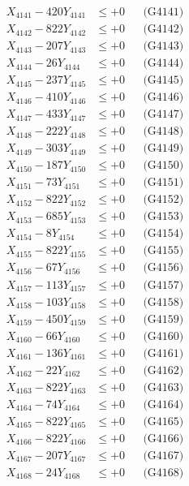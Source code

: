 \documentclass[a4paper,10pt]{article}
\begin{document}
{\begin{align}
\allowbreak
X_{4141} - 420Y_{4141} &\leq +0 && \text{(G4141)} \\
X_{4142} - 822Y_{4142} &\leq +0 && \text{(G4142)} \\
X_{4143} - 207Y_{4143} &\leq +0 && \text{(G4143)} \\
X_{4144} - 26Y_{4144} &\leq +0 && \text{(G4144)} \\
X_{4145} - 237Y_{4145} &\leq +0 && \text{(G4145)} \\
X_{4146} - 410Y_{4146} &\leq +0 && \text{(G4146)} \\
X_{4147} - 433Y_{4147} &\leq +0 && \text{(G4147)} \\
X_{4148} - 222Y_{4148} &\leq +0 && \text{(G4148)} \\
X_{4149} - 303Y_{4149} &\leq +0 && \text{(G4149)} \\
X_{4150} - 187Y_{4150} &\leq +0 && \text{(G4150)} \\
\allowbreak
X_{4151} - 73Y_{4151} &\leq +0 && \text{(G4151)} \\
X_{4152} - 822Y_{4152} &\leq +0 && \text{(G4152)} \\
X_{4153} - 685Y_{4153} &\leq +0 && \text{(G4153)} \\
X_{4154} - 8Y_{4154} &\leq +0 && \text{(G4154)} \\
X_{4155} - 822Y_{4155} &\leq +0 && \text{(G4155)} \\
X_{4156} - 67Y_{4156} &\leq +0 && \text{(G4156)} \\
X_{4157} - 113Y_{4157} &\leq +0 && \text{(G4157)} \\
X_{4158} - 103Y_{4158} &\leq +0 && \text{(G4158)} \\
X_{4159} - 450Y_{4159} &\leq +0 && \text{(G4159)} \\
X_{4160} - 66Y_{4160} &\leq +0 && \text{(G4160)} \\
\allowbreak
X_{4161} - 136Y_{4161} &\leq +0 && \text{(G4161)} \\
X_{4162} - 22Y_{4162} &\leq +0 && \text{(G4162)} \\
X_{4163} - 822Y_{4163} &\leq +0 && \text{(G4163)} \\
X_{4164} - 74Y_{4164} &\leq +0 && \text{(G4164)} \\
X_{4165} - 822Y_{4165} &\leq +0 && \text{(G4165)} \\
X_{4166} - 822Y_{4166} &\leq +0 && \text{(G4166)} \\
X_{4167} - 207Y_{4167} &\leq +0 && \text{(G4167)} \\
X_{4168} - 24Y_{4168} &\leq +0 && \text{(G4168)} \\

\end{align}}
\end{document}
